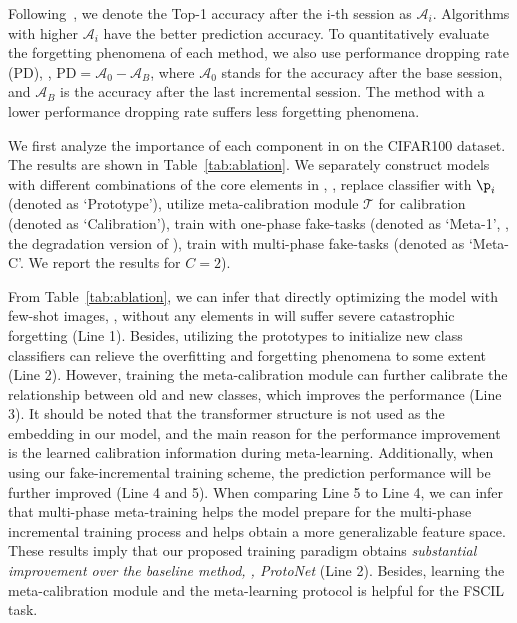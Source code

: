  


  Following~\cite{tao2020few,zhang2021few}, we denote the Top-1 accuracy after the i-th session as $\mathcal{A}_i$. Algorithms with higher $\mathcal{A}_i$ have the better prediction accuracy.
To quantitatively evaluate the forgetting phenomena of each method, we also use performance dropping rate (PD), \ie, $\text{PD}=\mathcal{A}_0-\mathcal{A}_B$, where $\mathcal{A}_0$ stands for the accuracy after the base session, and $\mathcal{A}_B$ is the accuracy after the last incremental session. The method with a lower performance dropping rate suffers less forgetting phenomena.










We first analyze the importance of each component in \name on the CIFAR100 dataset. The results are shown in Table~\ref{tab:ablation}. We separately construct models with different combinations of the core elements in \mame, \eg, replace classifier with $\p_i$ (denoted as `Prototype'), utilize meta-calibration module $\mathcal{T}$ for calibration (denoted as `Calibration'), train with one-phase fake-tasks (denoted as `Meta-1', \ie, the degradation version of \mame), train with multi-phase fake-tasks (denoted as `Meta-C'. We report the results for $C=2$).



From Table~\ref{tab:ablation}, we can infer that directly optimizing the model with few-shot images, \ie, without any elements in \name will suffer severe catastrophic forgetting (Line 1). Besides, utilizing the prototypes to initialize new class classifiers can relieve the overfitting and forgetting phenomena to some extent (Line 2). However, training the meta-calibration module can further calibrate the relationship between old and new classes, which improves the performance (Line 3). It should be noted that the transformer structure is not used as the embedding in our model, and the main reason for the performance improvement is the learned calibration information during meta-learning.
 Additionally, when using our fake-incremental training scheme, the prediction performance will be further improved (Line 4 and 5). When comparing Line 5 to Line 4, we can infer that multi-phase meta-training helps the model prepare for the multi-phase incremental training process and helps obtain a more generalizable feature space.  
 These results imply that our proposed training paradigm obtains \emph{substantial improvement over the baseline method, \ie, ProtoNet} (Line 2). Besides, learning the meta-calibration module and the meta-learning protocol is helpful for the FSCIL task. 





